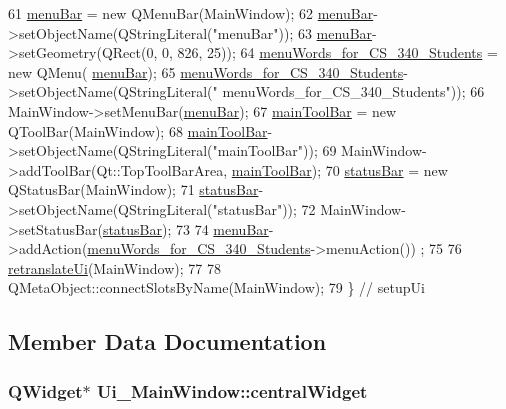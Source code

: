 \begin{DoxyCode}
61         \hyperlink{class_ui___main_window_a2be1c24ec9adfca18e1dcc951931457f}{menuBar} = \textcolor{keyword}{new} QMenuBar(MainWindow);
62         \hyperlink{class_ui___main_window_a2be1c24ec9adfca18e1dcc951931457f}{menuBar}->setObjectName(QStringLiteral(\textcolor{stringliteral}{"menuBar"}));
63         \hyperlink{class_ui___main_window_a2be1c24ec9adfca18e1dcc951931457f}{menuBar}->setGeometry(QRect(0, 0, 826, 25));
64         \hyperlink{class_ui___main_window_a7f4ea012695a9e61eb752b30df4caa38}{menuWords\_for\_CS\_340\_Students} = \textcolor{keyword}{new} QMenu(
      \hyperlink{class_ui___main_window_a2be1c24ec9adfca18e1dcc951931457f}{menuBar});
65         \hyperlink{class_ui___main_window_a7f4ea012695a9e61eb752b30df4caa38}{menuWords\_for\_CS\_340\_Students}->setObjectName(QStringLiteral(\textcolor{stringliteral}{"
      menuWords\_for\_CS\_340\_Students"}));
66         MainWindow->setMenuBar(\hyperlink{class_ui___main_window_a2be1c24ec9adfca18e1dcc951931457f}{menuBar});
67         \hyperlink{class_ui___main_window_a5172877001c8c7b4e0f6de50421867d1}{mainToolBar} = \textcolor{keyword}{new} QToolBar(MainWindow);
68         \hyperlink{class_ui___main_window_a5172877001c8c7b4e0f6de50421867d1}{mainToolBar}->setObjectName(QStringLiteral(\textcolor{stringliteral}{"mainToolBar"}));
69         MainWindow->addToolBar(Qt::TopToolBarArea, \hyperlink{class_ui___main_window_a5172877001c8c7b4e0f6de50421867d1}{mainToolBar});
70         \hyperlink{class_ui___main_window_a50fa481337604bcc8bf68de18ab16ecd}{statusBar} = \textcolor{keyword}{new} QStatusBar(MainWindow);
71         \hyperlink{class_ui___main_window_a50fa481337604bcc8bf68de18ab16ecd}{statusBar}->setObjectName(QStringLiteral(\textcolor{stringliteral}{"statusBar"}));
72         MainWindow->setStatusBar(\hyperlink{class_ui___main_window_a50fa481337604bcc8bf68de18ab16ecd}{statusBar});
73 
74         \hyperlink{class_ui___main_window_a2be1c24ec9adfca18e1dcc951931457f}{menuBar}->addAction(\hyperlink{class_ui___main_window_a7f4ea012695a9e61eb752b30df4caa38}{menuWords\_for\_CS\_340\_Students}->menuAction())
      ;
75 
76         \hyperlink{class_ui___main_window_a097dd160c3534a204904cb374412c618}{retranslateUi}(MainWindow);
77 
78         QMetaObject::connectSlotsByName(MainWindow);
79     \} \textcolor{comment}{// setupUi}
\end{DoxyCode}


\subsection{Member Data Documentation}
\hypertarget{class_ui___main_window_a30075506c2116c3ed4ff25e07ae75f81}{
\subsubsection[{central\-Widget}]{\setlength{\rightskip}{0pt plus 5cm}Q\-Widget$\ast$ Ui\-\_\-\-Main\-Window\-::central\-Widget}}\label{class_ui___main_window_a30075506c2116c3ed4ff25e07ae75f81}


